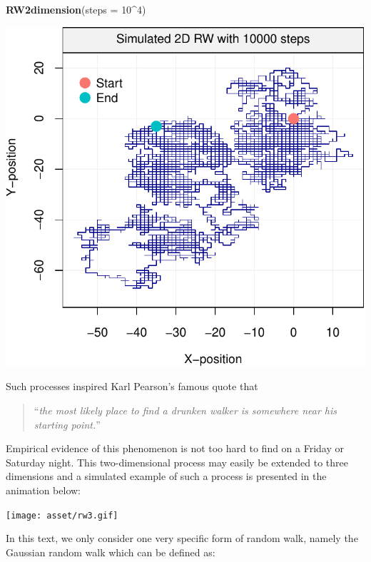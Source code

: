 \documentclass[]{book}
\newenvironment{Shaded}{\begin{snugshade}}{\end{snugshade}}
\newcommand{\DataTypeTok}[1]{\textcolor[rgb]{0.13,0.29,0.53}{#1}}
\newcommand{\DecValTok}[1]{\textcolor[rgb]{0.00,0.00,0.81}{#1}}
\newcommand{\KeywordTok}[1]{\textcolor[rgb]{0.13,0.29,0.53}{\textbf{#1}}}
\newcommand{\NormalTok}[1]{#1}
\newcommand{\OperatorTok}[1]{\textcolor[rgb]{0.81,0.36,0.00}{\textbf{#1}}}
\theoremstyle{definition}
\theoremstyle{definition}
\theoremstyle{definition}
\theoremstyle{remark}
\begin{document}
\begin{Shaded}
\begin{Highlighting}[]
\KeywordTok{RW2dimension}\NormalTok{(}\DataTypeTok{steps =} \DecValTok{10}\OperatorTok{^}\DecValTok{4}\NormalTok{)}
\end{Highlighting}
\end{Shaded}

\begin{center}\includegraphics{ts_files/figure-latex/RW2d-2} \end{center}

Such processes inspired Karl Pearson's famous quote that

\begin{quote}
``\emph{the most likely place to find a drunken walker is somewhere near
his starting point.}''
\end{quote}

Empirical evidence of this phenomenon is not too hard to find on a
Friday or Saturday night. This two-dimensional process may easily be
extended to three dimensions and a simulated example of such a process
is presented in the animation below:

\texttt{[image: asset/rw3.gif]}

In this text, we only consider one very specific form of random walk,
namely the Gaussian random walk which can be defined as:
\end{document}
